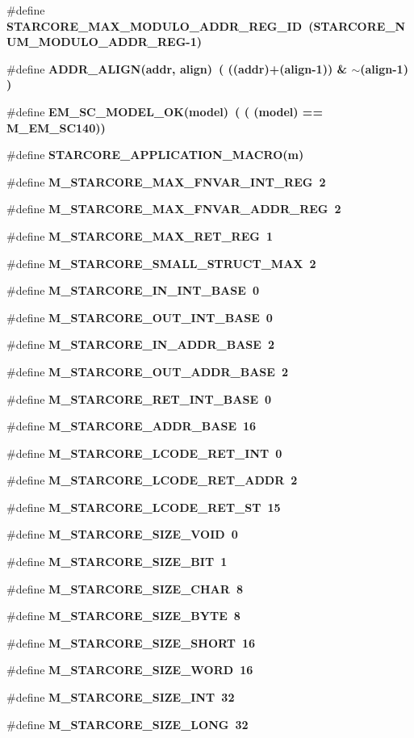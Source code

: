\begin{CompactItemize}
\item 
\#define \bf{STARCORE\_\-MAX\_\-MODULO\_\-ADDR\_\-REG\_\-ID}~(STARCORE\_\-NUM\_\-MODULO\_\-ADDR\_\-REG-1)
\item 
\#define \bf{ADDR\_\-ALIGN}(addr, align)~( ((addr)+(align-1)) \& $\sim$(align-1) )
\item 
\#define \bf{EM\_\-SC\_\-MODEL\_\-OK}(model)~( ( (model) == M\_\-EM\_\-SC140))
\item 
\#define \bf{STARCORE\_\-APPLICATION\_\-MACRO}(m)
\item 
\#define \bf{M\_\-STARCORE\_\-MAX\_\-FNVAR\_\-INT\_\-REG}~2
\item 
\#define \bf{M\_\-STARCORE\_\-MAX\_\-FNVAR\_\-ADDR\_\-REG}~2
\item 
\#define \bf{M\_\-STARCORE\_\-MAX\_\-RET\_\-REG}~1
\item 
\#define \bf{M\_\-STARCORE\_\-SMALL\_\-STRUCT\_\-MAX}~2
\item 
\#define \bf{M\_\-STARCORE\_\-IN\_\-INT\_\-BASE}~0
\item 
\#define \bf{M\_\-STARCORE\_\-OUT\_\-INT\_\-BASE}~0
\item 
\#define \bf{M\_\-STARCORE\_\-IN\_\-ADDR\_\-BASE}~2
\item 
\#define \bf{M\_\-STARCORE\_\-OUT\_\-ADDR\_\-BASE}~2
\item 
\#define \bf{M\_\-STARCORE\_\-RET\_\-INT\_\-BASE}~0
\item 
\#define \bf{M\_\-STARCORE\_\-ADDR\_\-BASE}~16
\item 
\#define \bf{M\_\-STARCORE\_\-LCODE\_\-RET\_\-INT}~0
\item 
\#define \bf{M\_\-STARCORE\_\-LCODE\_\-RET\_\-ADDR}~2
\item 
\#define \bf{M\_\-STARCORE\_\-LCODE\_\-RET\_\-ST}~15
\item 
\#define \bf{M\_\-STARCORE\_\-SIZE\_\-VOID}~0
\item 
\#define \bf{M\_\-STARCORE\_\-SIZE\_\-BIT}~1
\item 
\#define \bf{M\_\-STARCORE\_\-SIZE\_\-CHAR}~8
\item 
\#define \bf{M\_\-STARCORE\_\-SIZE\_\-BYTE}~8
\item 
\#define \bf{M\_\-STARCORE\_\-SIZE\_\-SHORT}~16
\item 
\#define \bf{M\_\-STARCORE\_\-SIZE\_\-WORD}~16
\item 
\#define \bf{M\_\-STARCORE\_\-SIZE\_\-INT}~32
\item 
\#define \bf{M\_\-STARCORE\_\-SIZE\_\-LONG}~32
\item 

\end{CompactItemize}
